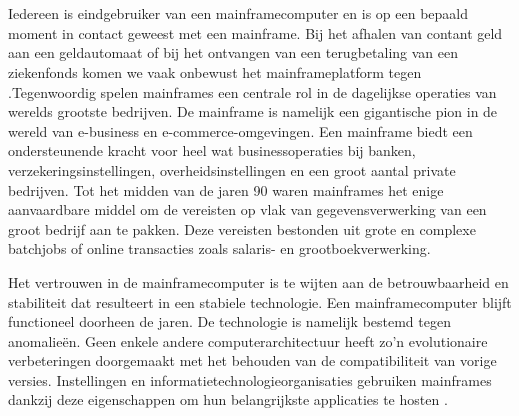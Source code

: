\section{}

Iedereen is eindgebruiker van een mainframecomputer en is op een bepaald moment in contact geweest met een mainframe. Bij het afhalen van contant geld aan een geldautomaat of bij het ontvangen van een terugbetaling van een ziekenfonds komen we vaak onbewust het mainframeplatform tegen \autocite{Ebbers2022}.Tegenwoordig spelen mainframes een centrale rol in de dagelijkse operaties van werelds grootste bedrijven. De mainframe is namelijk een gigantische pion in de wereld van e-business en e-commerce-omgevingen. Een mainframe biedt een ondersteunende kracht voor heel wat businessoperaties bij banken, verzekeringsinstellingen, overheidsinstellingen en een groot aantal private bedrijven. Tot het midden van de jaren 90 waren mainframes het enige aanvaardbare middel om de vereisten op vlak van gegevensverwerking van een groot bedrijf aan te pakken. Deze vereisten bestonden uit grote en complexe batchjobs of online transacties zoals salaris- en grootboekverwerking.

Het vertrouwen in de mainframecomputer is te wijten aan de betrouwbaarheid en stabiliteit dat resulteert in een stabiele technologie. Een mainframecomputer blijft functioneel doorheen de jaren. De technologie is namelijk bestemd tegen anomalieën. Geen enkele andere computerarchitectuur heeft zo'n evolutionaire verbeteringen doorgemaakt met het behouden van de compatibiliteit van vorige versies. Instellingen en informatietechnologieorganisaties gebruiken mainframes dankzij deze eigenschappen om hun belangrijkste applicaties te hosten \autocite{Ebbers2022}. 

\newpage 

\section{}
\label{sec:probleemstelling}

